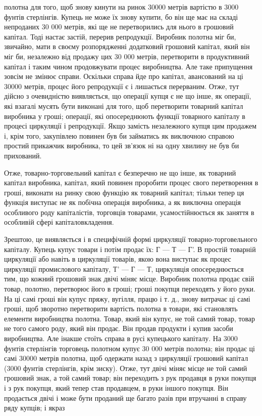 \parcont{}  %
полотна для того, щоб знову кинути на ринок 30000 метрів вартістю в 3000 фунтів стерлінгів. Купець
не може їх знову купити, бо він ще має на складі непроданих 30 000 метрів, які ще
не перетворились для нього в грошовий капітал. Тоді настає
застій, перерив репродукції. Виробник полотна міг би, звичайно,
мати в своєму розпорядженні додатковий грошовий капітал, який
він міг би, незалежно від продажу цих 30 000 метрів, перетворити
в продуктивний капітал і таким чином продовжувати процес
виробництва. Але таке припущення зовсім не змінює справи.
Оскільки справа йде про капітал, авансований на ці 30000 метрів,
процес його репродукції є і лишається перерваним. Отже, тут
дійсно з очевидністю виявляється, що операції купця є не що
інше, як операції, які взагалі мусять бути виконані для того, щоб
перетворити товарний капітал виробника у гроші; операції, які
опосереднюють функції товарного капіталу в процесі циркуляції і репродукції. Якщо замість
незалежного купця цим продажем і, крім того, закупівлею повинен був би займатись як виключною
справою простий прикажчик виробника, то цей зв’язок ні
на одну хвилину не був би прихований.

Отже, товарно-торговельний капітал є безперечно не що
інше, як товарний капітал виробника, капітал, який повинен проробити процес свого перетворення в
гроші, виконати на ринку
свою функцію як товарний капітал; тільки тепер ця функція виступає не як побічна операція виробника,
а як виключна операція особливого роду капіталістів, торговців товарами, усамостійнюється як заняття
в особливій сфері капіталовкладення.

Зрештою, це виявляється і в специфічній формі циркуляції
товарно-торговельного капіталу. Купець купує товари і потім
продає їх: Г — Т — Г'. В простій товарній циркуляції або навіть
в циркуляції товарів, якою вона виступає як процес циркуляції
промислового капіталу, Т' — Г — Т, циркуляція опосереднюється
тим, що кожний грошовий знак двічі міняє місце. Виробник полотна продає свій товар, полотно,
перетворює його в гроші;
гроші покупця переходять у його руки. На ці самі гроші він
купує пряжу, вугілля, працю і т. д., знову витрачає ці самі
гроші, щоб зворотно перетворити вартість полотна в товари, які
становлять елементи виробництва полотна. Товар, який він купує, не той самий товар, товар не того
самого роду, який
він продає. Він продав продукти і купив засоби виробництва. Але
інакше стоїть справа в русі купецького капіталу. На 3000 фунтів стерлінгів торговець полотном купує
30 000 метрів полотна;
він продає ці самі 30000 метрів полотна, щоб одержати назад
з циркуляції грошовий капітал (3000 фунтів стерлінгів, крім
зиску). Отже, тут двічі міняє місце не той самий грошовий знак,
а той самий товар; він переходить з рук продавця в руки покупця і з рук покупця, який тепер став
продавцем, в руки
іншого покупця. Він продається двічі і може бути проданий
ще багато разів при втручанні в справу ряду купців; і якраз
\parbreak{}  %
